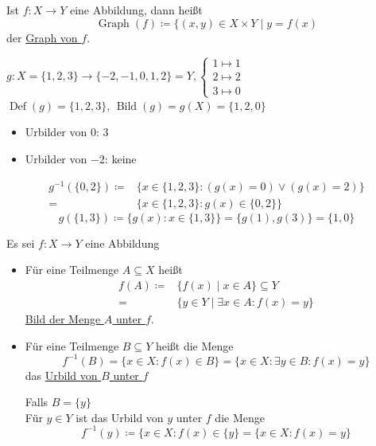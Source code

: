 \documentclass{myclass}
\begin{document}
\begin{definition}[Graph]
	Ist $ f : X \to Y $ eine Abbildung, dann heißt
	\[ \operatorname{Graph}(f) \coloneqq \{ ( x, y ) \in X \times Y \mid y = f(x) \]
	der \underline{Graph von $ f $}.
	\begin{example}
		\begin{math}
			g : X = \{ 1, 2, 3 \} \to \{ -2 , -1, 0, 1, 2 \} = Y,%
			\begin{cases}
				1 \mapsto 1\\
				2 \mapsto 2\\
				3 \mapsto 0
			\end{cases}
		\end{math}\\
		$ \operatorname{Def}(g) = \{ 1, 2, 3 \} $, $ \operatorname{Bild}(g) = g(X) = \{ 1, 2, 0 \} $
		\begin{itemize}
			\item Urbilder von $ 0 $: $ 3 $
			\item Urbilder von $ - 2 $: keine
		\end{itemize}
		\begin{align*}
			g^{-1}(\{ 0, 2 \}) \coloneqq &\{ x \in \{ 1, 2, 3 \} : ( g(x) = 0 ) \vee ( g(x) = 2 )\}\\
			= &\{ x \in \{ 1, 2, 3 \} : g(x) \in \{ 0, 2 \} \}
		\end{align*}
		\[ g(\{ 1, 3 \}) \coloneqq \{ g(x) : x \in \{ 1, 3 \} \} = \{ g(1), g(3) \} = \{ 1, 0 \} \]
	\end{example}
\end{definition}

\begin{definition}
	Es sei $ f : X \to Y $ eine Abbildung
	\begin{itemize}
		\item[\circled{1}] Für eine Teilmenge $ A \subseteq X $ heißt
			\begin{align*}
				f(A) \coloneq &\{ f(x) \mid x \in A \} \subseteq Y\\
				= &\{ y \in Y \mid \exists x \in A : f(x) = y \}
			\end{align*}
			\underline{Bild der Menge $ A $ unter $ f $}.
		\item[\circled{2}] Für eine Teilmenge $ B \subseteq Y $ heißt die Menge
			\[ f^{-1}(B) = \{ x \in X : f(x) \in B \} = \{ x \in X : \exists y \in B : f(x) = y \} \]
			das \underline{Urbild von $ B $ unter $ f $}\par
			Falls $ B = \{ y \} $\\
			Für $ y \in Y $ ist das Urbild von $ y $ unter $ f $ die Menge
			\[ f^{-1}(y) \coloneqq \{ x \in X : f(x) \in \{ y \} = \{ x \in X : f(x) = y \} \]
	\end{itemize}
\end{definition}
\end{document}
